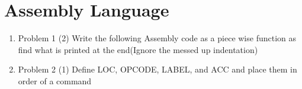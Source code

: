 \documentclass{article}
\begin{document}
\section{Assembly Language}
\begin{enumerate}
    \item {Problem 1 (2) Write the following Assembly code as a piece wise function as find what is printed at the end(Ignore the messed up indentation)}

    \item{Problem 2 (1) Define LOC, OPCODE, LABEL, and ACC and place them in order of a command}
\end{enumerate}
\end{document}
